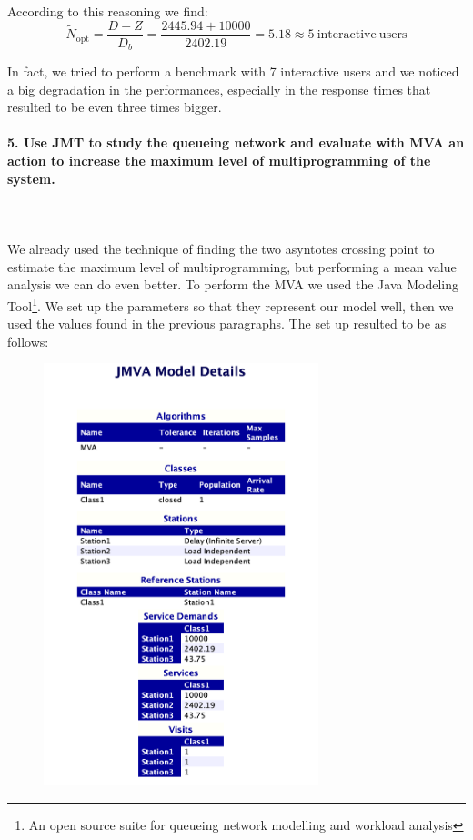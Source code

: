 \documentclass[11pt]{scrartcl} %
\begin{document}
According to this reasoning we find: $$\widetilde{N}_{\mathrm{opt}}=\dfrac{D+Z}{D_b}=\dfrac{2445.94+10000}{2402.19}=5.18\approx 5\ \mathrm{interactive\ users}$$

In fact, we tried to perform a benchmark with 7 interactive users and we noticed a big degradation in the performances, especially in the response times that resulted to be even three times bigger.


\paragraph*{5. Use JMT to study the queueing network and evaluate with MVA an action to increase the maximum level of multiprogramming of the system.} \mbox{}\\\\

We already used the technique of finding the two asyntotes crossing point to estimate the maximum level of multiprogramming, but performing a mean value analysis we can do even better. To perform the MVA we used the Java Modeling Tool\footnote{An open source suite for queueing network modelling and workload analysis}. We set up the parameters so that they represent our model well, then we used the values found in the previous paragraphs. The set up resulted to be as follows:

\begin{figure}[H]
\centering
\includegraphics[width=8cm]{Images/JMVAsynopsis.png}
\end{figure}
\end{document}
